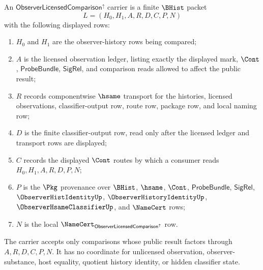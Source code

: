 \begin{definition}
\label{def:observer-licensed-comparison-carrier}
An $\mathsf{ObserverLicensedComparison}^{\uparrow}$ carrier is a finite $\BHist$ packet
$$
L=(H_0,H_1,A,R,D,C,P,N)
$$
with the following displayed rows:
\begin{enumerate}
\item $H_0$ and $H_1$ are the observer-history rows being compared;
\item $A$ is the licensed observation ledger, listing exactly the displayed mark, $\Cont$, $\mathsf{ProbeBundle}$, $\mathsf{SigRel}$, and comparison reads allowed to affect the public result;
\item $R$ records componentwise $\hsame$ transport for the histories, licensed observations, classifier-output row, route row, package row, and local naming row;
\item $D$ is the finite classifier-output row, read only after the licensed ledger and transport rows are displayed;
\item $C$ records the displayed $\Cont$ routes by which a consumer reads $H_0,H_1,A,R,D,P,N$;
\item $P$ is the $\Pkg$ provenance over $\BHist$, $\hsame$, $\Cont$, $\mathsf{ProbeBundle}$, $\mathsf{SigRel}$, $\ObserverHistIdentityUp$, $\ObserverHistoryIdentityUp$, $\ObserverHsameClassifierUp$, and $\NameCert$ rows;
\item $N$ is the local $\NameCert_{\mathsf{ObserverLicensedComparison}^{\uparrow}}$ row.
\end{enumerate}
The carrier accepts only comparisons whose public result factors through $A,R,D,C,P,N$. It has no coordinate for unlicensed observation, observer-substance, host equality, quotient history identity, or hidden classifier state.
\end{definition}

